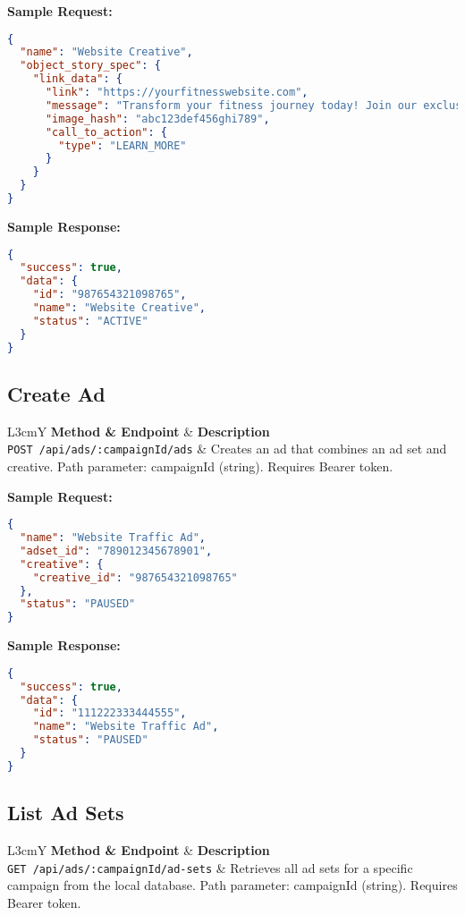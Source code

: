 \documentclass[11pt,a4paper]{article}
\begin{document}
\textbf{Sample Request:}
\begin{lstlisting}[language=json]
{
  "name": "Website Creative",
  "object_story_spec": {
    "link_data": {
      "link": "https://yourfitnesswebsite.com",
      "message": "Transform your fitness journey today! Join our exclusive program and see real results in just 30 days.",
      "image_hash": "abc123def456ghi789",
      "call_to_action": {
        "type": "LEARN_MORE"
      }
    }
  }
}
\end{lstlisting}

\textbf{Sample Response:}
\begin{lstlisting}[language=json]
{
  "success": true,
  "data": {
    "id": "987654321098765",
    "name": "Website Creative",
    "status": "ACTIVE"
  }
}
\end{lstlisting}

\subsection{Create Ad}
\begin{longtable}{L{3cm}Y}
\toprule
\textbf{Method \& Endpoint} & \textbf{Description} \\
\midrule
\texttt{POST /api/ads/:campaignId/ads} & Creates an ad that combines an ad set and creative. Path parameter: campaignId (string). Requires Bearer token. \\
\bottomrule
\end{longtable}

\textbf{Sample Request:}
\begin{lstlisting}[language=json]
{
  "name": "Website Traffic Ad",
  "adset_id": "789012345678901",
  "creative": {
    "creative_id": "987654321098765"
  },
  "status": "PAUSED"
}
\end{lstlisting}

\textbf{Sample Response:}
\begin{lstlisting}[language=json]
{
  "success": true,
  "data": {
    "id": "111222333444555",
    "name": "Website Traffic Ad",
    "status": "PAUSED"
  }
}
\end{lstlisting}

\subsection{List Ad Sets}
\begin{longtable}{L{3cm}Y}
\toprule
\textbf{Method \& Endpoint} & \textbf{Description} \\
\midrule
\texttt{GET /api/ads/:campaignId/ad-sets} & Retrieves all ad sets for a specific campaign from the local database. Path parameter: campaignId (string). Requires Bearer token. \\
\bottomrule
\end{longtable}
\end{document}
